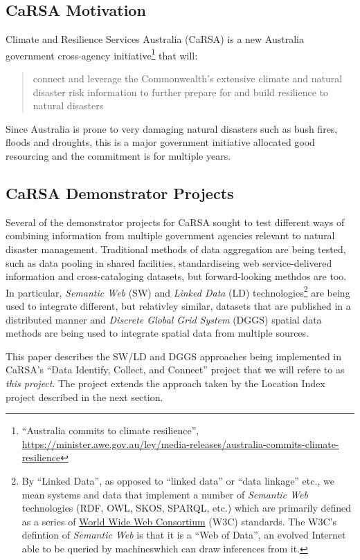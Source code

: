 \documentclass[runningheads]{llncs}
\begin{document}
\subsection{CaRSA Motivation}
Climate and Resilience Services Australia (CaRSA) is a new Australia government cross-agency initiative\footnote{``Australia commits to climate resilience'', \url{https://minister.awe.gov.au/ley/media-releases/australia-commits-climate-resilience}}
that will:

\begin{quote}
    connect and leverage the Commonwealth’s extensive climate and natural disaster risk information to further prepare for and build 
    resilience to natural disasters
\end{quote}

Since Australia is prone to very damaging natural disasters such as bush fires, floods and droughts, this is a major government initiative
allocated good resourcing and the commitment is for multiple years.

\subsection{CaRSA Demonstrator Projects}
Several of the demonstrator projects for CaRSA sought to test different ways of combining information from multiple government agencies 
relevant to natural disaster management. Traditional methods of data aggregation are being tested, such as data pooling in shared facilities,
standardiseing web service-delivered information and cross-cataloging datasets, but forward-looking methdos are too. In particular,
\textit{Semantic Web} (SW) and \textit{Linked Data} (LD) technologies\footnote{By ``Linked Data'', as opposed to ``linked data'' or ``data linkage'' etc.,
we mean systems and data that implement a number of \textit{Semantic Web} technologies (RDF, OWL, SKOS, SPARQL, etc.) which are primarily 
defined as a series of \href{https://www.w3.org/standards/semanticweb/data}{World Wide Web Consortium} (W3C) standards. The W3C's defintion of 
\textit{Semantic Web} is that it is a ``Web of Data'', an evolved Internet able to be queried by machineswhich can draw inferences from it.}
are being used to integrate different, but relativley similar, datasets that are published in a distributed manner and
\textit{Discrete Global Grid System} (DGGS) spatial data methods are being used to integrate spatial data from multiple sources.

This paper describes the SW/LD and DGGS approaches being implemented in CaRSA's ``Data Identify, Collect, and Connect'' project that we will 
refere to as \textit{this project}. The project extends the approach taken by the Location Index project described in the next section.
\end{document}
